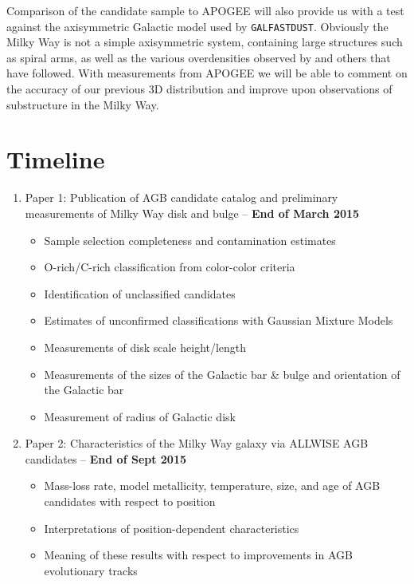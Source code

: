 Comparison of the candidate sample to APOGEE will also provide us with a test against the axisymmetric Galactic model used by {\tt GALFASTDUST}. Obviously the Milky Way is not a simple axisymmetric system, containing large structures such as spiral arms, as well as the various overdensities observed by \cite{2008ApJ...673..864J} and others that have followed.  With measurements from APOGEE we will be able to comment on the accuracy of our previous 3D distribution and improve upon observations of substructure in the Milky Way.

\section{Timeline}
\begin{enumerate}
\item Paper 1: Publication of AGB candidate catalog and preliminary measurements of Milky Way disk and bulge -- \textbf{End of March 2015}
	\begin{itemize}
		\item Sample selection completeness and contamination estimates
		\item O-rich/C-rich classification from color-color criteria
		\item Identification of unclassified candidates
		\item Estimates of unconfirmed classifications with Gaussian Mixture Models
		\item Measurements of disk scale height/length
		\item Measurements of the sizes of the Galactic bar \& bulge and orientation of the Galactic bar
		\item Measurement of radius of Galactic disk
	\end{itemize}	

\item Paper 2: Characteristics of the Milky Way galaxy via ALLWISE AGB candidates -- \textbf{End of Sept 2015}
	\begin{itemize}
		\item Mass-loss rate, model metallicity, temperature, size, and age of AGB candidates with respect to position
		\item Interpretations of position-dependent characteristics
		\item Meaning of these results with respect to improvements in AGB evolutionary tracks
	\end{itemize}
	

\end{enumerate}
